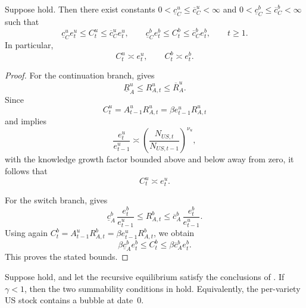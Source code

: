 \documentclass{article}
\begin{document}
\begin{lem}\label{lem_total_return_consumption_bounds}
Suppose  hold. Then there exist constants $0<\underline c_C^u\le \overline c_C^u<\infty$ and $0<\underline c_C^b\le \overline c_C^b<\infty$ such that
\[
\underline c_C^u e_t^u\le C_t^u\le \overline c_C^u e_t^u,
\qquad
\underline c_C^b e_t^b\le C_t^b\le \overline c_C^b e_t^b,
\qquad
t\ge 1.
\]
In particular,
\[
C_t^u\asymp e_t^u,
\qquad
C_t^b\asymp e_t^b.
\]
\end{lem}

\begin{proof}
For the continuation branch,  gives
\[
\underline R_A^u\le R_{A,t}^u\le \overline R_A^u.
\]
Since
\[
C_t^u=A_{t-1}^uR_{A,t}^u=\beta e_{t-1}^uR_{A,t}^u
\]
and  implies
\[
\frac{e_t^u}{e_{t-1}^u}
\asymp
\left(\frac{N_{US,t}}{N_{US,t-1}}\right)^{\nu_u},
\]
with the knowledge growth factor bounded above and below away from zero, it follows that
\[
C_t^u\asymp e_t^u.
\]

For the switch branch,  gives
\[
\underline c_A^b\,\frac{e_t^b}{e_{t-1}^u}
\le
R_{A,t}^b
\le
\overline c_A^b\,\frac{e_t^b}{e_{t-1}^u}.
\]
Using again $C_t^b=A_{t-1}^uR_{A,t}^b=\beta e_{t-1}^uR_{A,t}^b$, we obtain
\[
\beta\underline c_A^b e_t^b
\le
C_t^b
\le
\beta\overline c_A^b e_t^b.
\]
This proves the stated bounds.
\end{proof}

\begin{thm}\label{thm_prod_sufficient}
Suppose  hold, and let the recursive equilibrium satisfy the conclusions of . If $\gamma<1$, then the two summability conditions in  hold. Equivalently, the per-variety US stock contains a bubble at date~0.
\end{thm}
\end{document}

